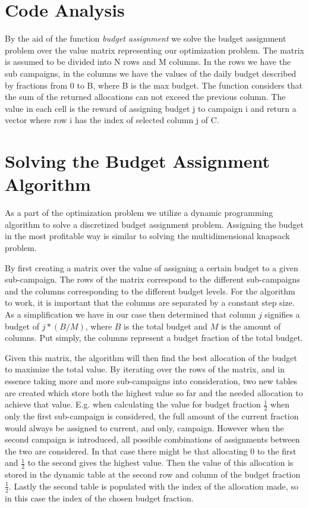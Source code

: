 \section{Code Analysis}
\label{sec:Opt_Code Analysis}

By the aid of the function \textit{budget assignment} we solve the budget assignment problem over the value matrix representing our optimization problem. The matrix is assumed to be divided into N rows and M columns. In the rows we have the sub campaigns, in the columns we have the values of the daily budget described by fractions from 0 to B, where B is the max budget. The function considers that the sum of the returned allocations can not exceed the previous column. The value in each cell is the reward of assigning budget j to campaign i and return a vector where row i has the index of selected column j of C.

\section{Solving the Budget Assignment Algorithm}
\label{sec:budget_assignment_algorithm}

As a part of the optimization problem we utilize a dynamic programming algorithm to solve a discretized budget assignment problem. Assigning the budget in the most profitable way is similar to solving the multidimensional knapsack problem.

By first creating a matrix over the value of assigning a certain budget to a given sub-campaign. The rows of the matrix correspond to the different sub-campaigns and the columns corresponding to the different budget levels. For the algorithm to work, it is important that the columns are separated by a constant step size. As a simplification we have in our case then determined that column $j$ signifies a budget of $j * (B / M)$, where $B$ is the total budget and $M$ is the amount of columns. Put simply, the columns represent a budget fraction of the total budget.

Given this matrix, the algorithm will then find the best allocation of the budget to maximize the total value. By iterating over the rows of the matrix, and in essence taking more and more sub-campaigns into consideration, two new tables are created which store both the highest value so far and the needed allocation to achieve that value. E.g. when calculating the value for budget fraction $\frac{1}{2}$ when only the first sub-campaign is considered, the full amount of the current fraction would always be assigned to current, and only, campaign. However when the second campaign is introduced, all possible combinations of assignments between the two are considered. In that case there might be that allocating $0$ to the first and $\frac{1}{2}$ to the second gives the highest value. Then the value of this allocation is stored in the dynamic table at the second row and column of the budget fraction $\frac{1}{2}$. Lastly the second table is populated with the index of the allocation made, so in this case the index of the chosen budget fraction.

